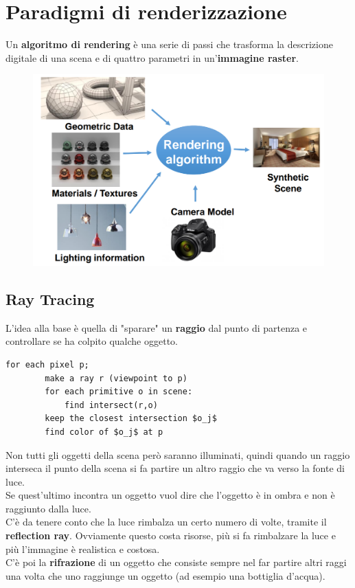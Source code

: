 \section{Paradigmi di renderizzazione}
Un \textbf{algoritmo di rendering} è una serie di passi che trasforma la descrizione digitale di una scena e di quattro parametri in un'\textbf{immagine raster}.\\
\begin{figure}[h]
	\includegraphics[scale=0.25]{rendering_algorithm.png}
	\centering
\end{figure}

\subsection{Ray Tracing}
L'idea alla base è quella di "sparare" un \textbf{raggio} dal punto di partenza e controllare se ha colpito qualche oggetto.
\begin{lstlisting}[mathescape=true]
	for each pixel p;
		make a ray r (viewpoint to p)
		for each primitive o in scene:
			find intersect(r,o)
		keep the closest intersection $o_j$
		find color of $o_j$ at p
\end{lstlisting}
Non tutti gli oggetti della scena però saranno illuminati, quindi quando un raggio interseca il punto della scena si fa partire un altro raggio che va verso la fonte di luce.\\
Se quest'ultimo incontra un oggetto vuol dire che l'oggetto è in ombra e non è raggiunto dalla luce.\\
C'è da tenere conto che la luce rimbalza un certo numero di volte, tramite il \textbf{reflection ray}. Ovviamente questo costa risorse, più si fa rimbalzare la luce e più l'immagine è realistica e costosa.\\
C'è poi la \textbf{rifrazione} di un oggetto che consiste sempre nel far partire altri raggi una volta che uno raggiunge un oggetto (ad esempio una bottiglia d'acqua).

